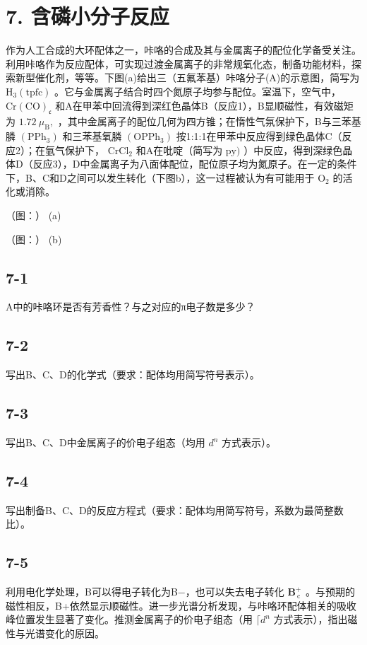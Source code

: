 \section*{7. 含磷小分子反应}
作为⼈⼯合成的⼤环配体之⼀，咔咯的合成及其与⾦属离⼦的配位化学备受关注。利⽤咔咯作为反应配体，可实现过渡⾦属离⼦的⾮常规氧化态，制备功能材料，探索新型催化剂，等等。下图(a)给出三（五氟苯基）咔咯分⼦(A)的⽰意图，简写为 $\mathrm { H } _ { 3 } ( \mathrm { t p f c } )$ 。它与⾦属离⼦结合时四个氮原⼦均参与配位。室温下，空⽓中，$\mathrm { C r } ( \mathrm { C O } ) _ { \mathfrak { c } }$ 和A在甲苯中回流得到深红⾊晶体B（反应1），B显顺磁性，有效磁矩为 $1 . 7 2 \ \mu _ { \mathrm { B } } ,$ ，其中⾦属离⼦的配位⼏何为四⽅锥；在惰性⽓氛保护下，B与三苯基膦 $\left( \mathrm { P P h } _ { 3 } \right)$ 和三苯基氧膦 $\mathrm { ( O P P h _ { 3 } ) }$ 按1:1:1在甲苯中反应得到绿⾊晶体C（反应2）；在氩⽓保护下， $\mathrm { C r C l _ { 2 } }$ 和A在吡啶（简写为 $\mathrm { p y } )$ ）中反应，得到深绿⾊晶体D（反应3），D中⾦属离⼦为⼋⾯体配位，配位原⼦均为氮原⼦。在⼀定的条件下，B、C和D之间可以发⽣转化（下图b），这⼀过程被认为有可能⽤于 $\mathrm { O _ { 2 } }$ 的活化或消除。

（图：）
(a)

（图：）
(b)

\subsection*{7-1}
A中的咔咯环是否有芳⾹性？与之对应的π电⼦数是多少？

\subsection*{7-2}
写出B、C、D的化学式（要求：配体均⽤简写符号表⽰）。

\subsection*{7-3}
写出B、C、D中⾦属离⼦的价电⼦组态（均⽤ $d ^ { n }$ ⽅式表⽰）。

\subsection*{7-4}
写出制备B、C、D的反应⽅程式（要求：配体均⽤简写符号，系数为最简整数⽐）。

\subsection*{7-5}
利⽤电化学处理，B可以得电⼦转化为B−，也可以失去电⼦转化 $\mathbf { B } _ { \mathrm { ~ c ~ } } ^ { + }$ 。与预期的磁性相反，B+依然显⽰顺磁性。进⼀步光谱分析发现，与咔咯环配体相关的吸收峰位置发⽣显著了变化。推测⾦属离⼦的价电⼦组态（⽤ $\lceil d ^ { n }$ ⽅式表⽰），指出磁性与光谱变化的原因。
